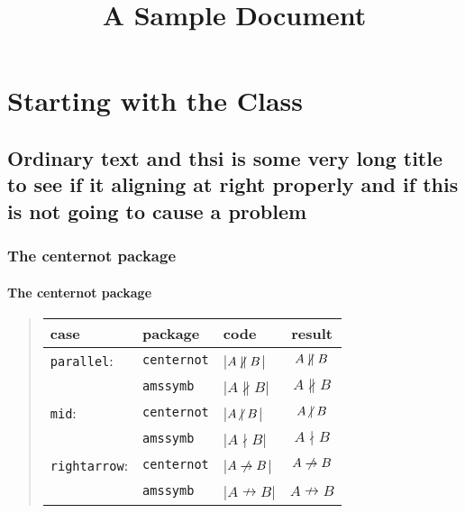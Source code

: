 \documentclass[book, 12pt]{phd}
\newcounter{chapter}
\begin{document}
\title{A Sample Document}


\def\cs#1{\texttt{#1}}
\let\xpackage\cs
\tableofcontents
\mainmatter



\chapter{Starting with the Class}

\section{Ordinary text and thsi is some very long title to see if it aligning at right properly and if this is not going to cause a problem}

\subsection{The centernot package}

\subsubsection{The centernot package}

\begin{quote}
   \begin{tabular}{@{}lllc@{}}
     case & package & code & result\\
     \hline
     \cs{parallel}:
     &\xpackage{centernot} & |$A \centernot\parallel B$|
                           &  $A \centernot\parallel B$\\
     &\xpackage{amssymb}   & |$A \nparallel B$|
                           & $A\nparallel B$\\
     \hline
     \cs{mid}:
     &\xpackage{centernot} & |$A \centernot\mid B$|
                           &  $A \centernot\mid B$\\
     &\xpackage{amssymb}   & |$A \nmid B$|
                           &  $A \nmid B$\\
     
     \hline
     \cs{rightarrow}:
     &\xpackage{centernot} & |$A \centernot\rightarrow B$|
                           &  $A \centernot\rightarrow B$\\
     &\xpackage{amssymb}   & |$A \nrightarrow B$|
                           &  $A \nrightarrow B$\\
    
   \end{tabular}
 \end{quote}
\end{document}
